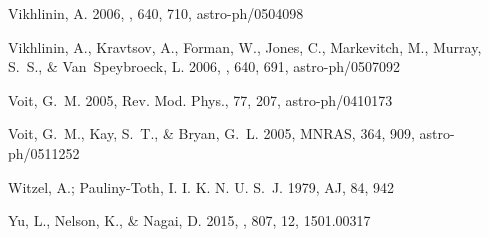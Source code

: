 \documentclass[traditabstract]{aa}
\begin{document}
\begin{thebibliography}{81}
Vikhlinin, A. 2006, \apj, 640, 710, astro-ph/0504098

Vikhlinin, A., Kravtsov, A., Forman, W., Jones, C., Markevitch, M., Murray,
  S.~S., \& Van~Speybroeck, L. 2006, \apj, 640, 691, astro-ph/0507092

Voit, G.~M. 2005, Rev. Mod. Phys., 77, 207, astro-ph/0410173

Voit, G.~M., Kay, S.~T., \& Bryan, G.~L. 2005, MNRAS, 364, 909,
  astro-ph/0511252

Witzel, A.; Pauliny-Toth, I. I. K. N. U. S.~J. 1979, AJ, 84, 942

Yu, L., Nelson, K., \& Nagai, D. 2015, \apj, 807, 12, 1501.00317

\end{thebibliography}
\end{document}
